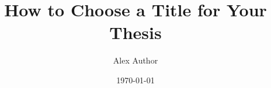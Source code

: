 
\title{How to Choose a Title for Your Thesis}
\author{Alex Author}
\newcommand{\supervisor}{TODO: Supervisor\\TODO: Co-Supervisor}

\date{\today}  %

\publishers{Ludwig-Maximilians-Universität München\\
Fakultät für Mathematik, Informatik und Statistik\\
Institut für Statistik
}

\newcommand{\thesisfield}{Statistics}

\newcommand{\thesisdegree}{Master of Science (M.Sc.)}
